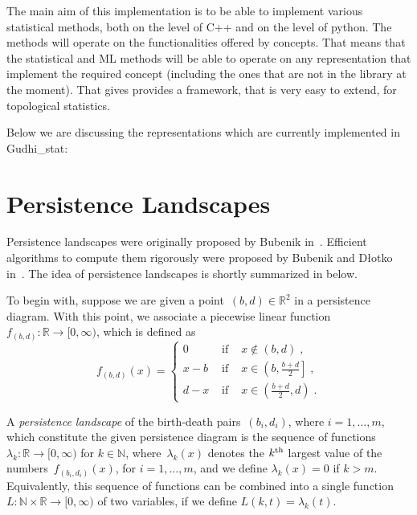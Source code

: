 \documentclass[11pt]{article}
\begin{document}
The main aim of this implementation is to be able to implement various statistical methods, both on the level of C++ and on the level of python. The methods will operate on the functionalities offered by concepts. That means that the statistical and ML methods will be able to operate on any representation that implement the required concept (including the ones that are not in the library at the moment). That gives provides a framework, that is very easy to extend, for topological statistics.


Below we are discussing the representations which are currently implemented in Gudhi\_stat:


\section{Persistence Landscapes}
\label{sec:persistence_landscapes}
Persistence landscapes were originally proposed by Bubenik in~\cite{landscapes1}. Efficient algorithms to compute them rigorously were proposed by Bubenik and D{\l}otko in~\cite{landscapes2}. The idea of persistence landscapes is shortly summarized in below.

To begin with, suppose we are given a point~$(b,d) \in \mathbb{R}^2$ in a
persistence diagram. With this point, we associate a piecewise
linear function~$f_{(b,d)} : \mathbb{R} \rightarrow [0,\infty)$, which is
defined as
%
\begin{equation} \label{eq:basicLand}
  f_{(b,d)}(x) =
  \left\{ \begin{array}{ccl}
            0     & \mbox{ if } & x \not\in (b, d) \; , \\[2ex]
            x - b & \mbox{ if } & x \in \left( b, \frac{b+d}{2}
              \right] \; , \\[2ex]
            d - x & \mbox{ if } & x \in \left(\frac{b+d}{2},
              d \right) \; .
  \end{array} \right.
\end{equation}

A \emph{persistence landscape} of the birth-death
pairs~$(b_i , d_i)$, where $i = 1,\ldots,m$, which constitute the given
persistence diagram is the sequence of functions $\lambda_k : \mathbb{R}
\rightarrow [0,\infty)$ for $k \in \mathbb{N}$, where~$\lambda_k(x)$
denotes the $k^{\rm th}$ largest value of the numbers~$f_{(b_i,d_i)}(x)$,
for $i = 1, \ldots, m$, and we define $\lambda_k(x) = 0$ if $k > m$.
Equivalently, this sequence of functions can be combined into a single
function $L : \mathbb{N} \times \mathbb{R} \to [0,\infty)$ of two
variables, if we define $L(k,t) = \lambda_k(t)$.
\end{document}
